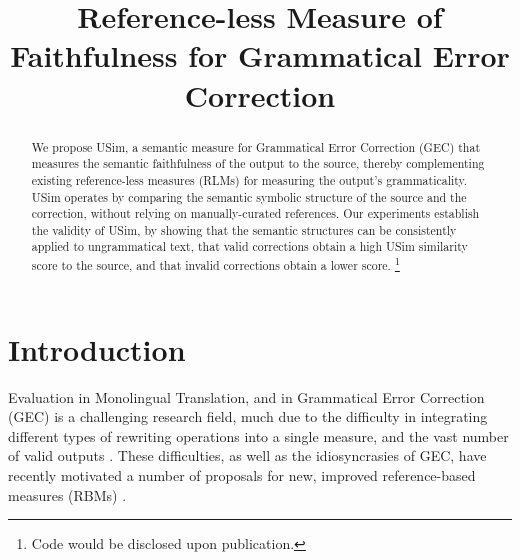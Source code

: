 \documentclass[a4paper, 11pt]{article}
\begin{document}
\title{Reference-less Measure of Faithfulness for Grammatical Error Correction}
\maketitle

\begin{abstract}
  We propose {\sc USim}, a semantic measure for Grammatical Error Correction (GEC)
  that measures the semantic faithfulness of the output to the source,
  thereby complementing existing reference-less measures (RLMs) for measuring the output's grammaticality.
  {\sc USim} operates by comparing the semantic symbolic structure of the source and the correction,
	without relying on manually-curated references.
  Our experiments establish the validity of {\sc USim},
  by showing that the semantic structures can be consistently applied to ungrammatical text, that
  valid corrections obtain a high {\sc USim} similarity score to the source, and that
  invalid corrections obtain a lower score. \footnote{Code would be disclosed upon publication.}
\end{abstract}


\section{Introduction}

Evaluation in Monolingual Translation, and in Grammatical Error Correction (GEC) is a challenging
research field, much due to the difficulty in integrating 
different types of rewriting operations into a single measure, and the vast number of valid outputs
\cite{tetreault2008native,madnani2011they,chodorow2012problems,bryant2015far}.
These difficulties, as well as the idiosyncrasies of GEC,	 have recently motivated
a number of proposals for new, improved reference-based measures (RBMs)  \cite{dahlmeier2012better,felice2015towards,napoles2015ground}.
\end{document}
